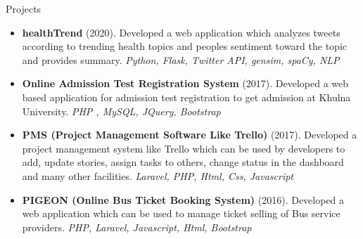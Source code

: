 \documentclass[]{mcdowellcv}
\begin{document}
	
	\begin{cvsection}{Projects}
		\begin{cvsubsection}{}{}{}
			\begin{itemize}
			 
			 \item \textbf{healthTrend} (2020). Developed a web application which analyzes tweets according to trending health topics and peoples sentiment toward the topic and provides summary. \emph{Python, Flask, Twitter API, gensim, spaCy, NLP}
			
			  \item \textbf{Online Admission Test Registration System} (2017). 
				Developed a web based application for admission test registration to get admission at Khulna University. \emph{PHP , MySQL, JQuery, Bootstrap}
				
				\item \textbf{PMS (Project Management Software Like Trello) } (2017). Developed a project management system like Trello which can be used by developers to add, update stories, assign tasks to others, change status in the dashboard and many other facilities.  \emph{Laravel, PHP, Html, Css, Javascript}
				
				\item \textbf{PIGEON (Online Bus Ticket Booking System)} (2016). Developed a web application which can be used to manage ticket selling of Bus service providers. \emph{PHP, Laravel, Javascript, Html, Bootstrap}
				
				
			\end{itemize}
		\end{cvsubsection}
	\end{cvsection}
	
	
		
\end{document}

